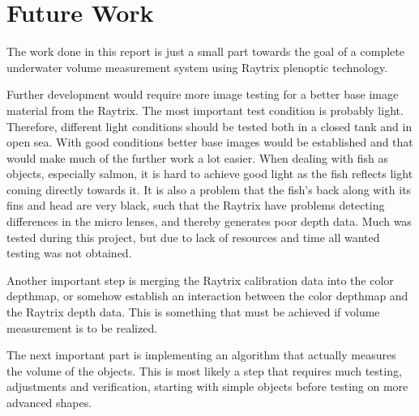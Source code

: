 \section{Future Work} \label{future_work}

The work done in this report is just a small part towards the goal of a complete underwater volume measurement system using Raytrix plenoptic technology. 

Further development would require more image testing for a better base image material from the Raytrix. The most important test condition is probably light. Therefore, different light conditions should be tested both in a closed tank and in open sea. With good conditions better base images would be established and that would make much of the further work a lot easier. 
When dealing with fish as objects, especially salmon, it is hard to achieve good light as the fish reflects light coming directly towards it. It is also a problem that the fish's back along with its fins and head are very black, such that the Raytrix have problems detecting differences in the micro lenses, and thereby generates poor depth data.
Much was tested during this project, but due to lack of resources and time all wanted testing was not obtained.

Another important step is merging the Raytrix calibration data into the color depthmap, or somehow establish an interaction between the color depthmap and the Raytrix depth data. This is something that must be achieved if volume measurement is to be realized.

The next important part is implementing an algorithm that actually measures the volume of the objects. This is most likely a step that requires much testing, adjustments and verification, starting with simple objects before testing on more advanced shapes. 

